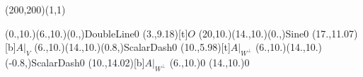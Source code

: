 \unitlength=1bp%

\begin{feynartspicture}(200,200)(1,1)

\FADiagram{}
\FAProp(0.,10.)(6.,10.)(0.,){DoubleLine}{0}
\FALabel(3.,9.18)[t]{$O$}
\FAProp(20,10.)(14.,10.)(0.,){Sine}{0}
\FALabel(17.,11.07)[b]{$A|_V$}
\FAProp(6.,10.)(14.,10.)(0.8,){ScalarDash}{0}
\FALabel(10.,5.98)[t]{$A|_{W^\perp}$}
\FAProp(6.,10.)(14.,10.)(-0.8,){ScalarDash}{0}
\FALabel(10.,14.02)[b]{$A|_{W^\perp}$}
\FAVert(6.,10.){0}
\FAVert(14.,10.){0}
\end{feynartspicture}

